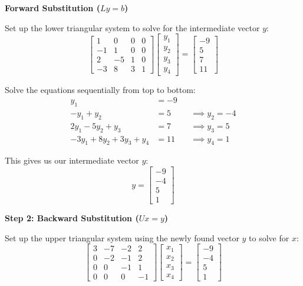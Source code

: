 \documentclass[../linear-algebra.tex]{subfiles}
\begin{document}
\vspace{0.5cm}
\noindent\textbf{Forward Substitution ($Ly = b$)}

\noindent Set up the lower triangular system to solve for the intermediate vector $y$:
\[
\begin{bmatrix} 1 & 0 & 0 & 0 \\ -1 & 1 & 0 & 0 \\ 2 & -5 & 1 & 0 \\ -3 & 8 & 3 & 1 \end{bmatrix}
\begin{bmatrix} y_1 \\ y_2 \\ y_3 \\ y_4 \end{bmatrix}
= \begin{bmatrix} -9 \\ 5 \\ 7 \\ 11 \end{bmatrix}
\]

\noindent Solve the equations sequentially from top to bottom:
\[
\begin{aligned}
y_1 &= -9 \\
-y_1 + y_2 &= 5 &&\implies y_2 = -4 \\
2y_1 - 5y_2 + y_3 &= 7 &&\implies y_3 = 5 \\
-3y_1 + 8y_2 + 3y_3 + y_4 &= 11 &&\implies y_4 = 1
\end{aligned}
\]

\noindent This gives us our intermediate vector $y$:
\[
y = \begin{bmatrix} -9 \\ -4 \\ 5 \\ 1 \end{bmatrix}
\]

\vspace{0.5cm}
\noindent\textbf{Step 2: Backward Substitution ($Ux = y$)}

\noindent Set up the upper triangular system using the newly found vector $y$ to solve for $x$:
\[
\begin{bmatrix} 3 & -7 & -2 & 2 \\ 0 & -2 & -1 & 2 \\ 0 & 0 & -1 & 1 \\ 0 & 0 & 0 & -1 \end{bmatrix}
\begin{bmatrix} x_1 \\ x_2 \\ x_3 \\ x_4 \end{bmatrix}
= \begin{bmatrix} -9 \\ -4 \\ 5 \\ 1 \end{bmatrix}
\]
\end{document}
